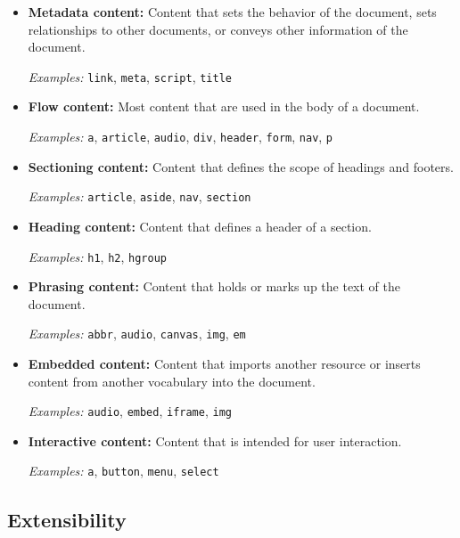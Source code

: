 \begin{itemize}
\item \textbf{Metadata content:} Content that sets the behavior of the
  document, sets relationships to other documents, or conveys other
  information of the document.

  \textit{Examples:} \texttt{link}, \texttt{meta}, \texttt{script},
  \texttt{title}

\item \textbf{Flow content:} Most content that are used in the body of
  a document.

  \textit{Examples:} \texttt{a}, \texttt{article}, \texttt{audio},
  \texttt{div}, \texttt{header}, \texttt{form}, \texttt{nav},
  \texttt{p}

\item \textbf{Sectioning content:} Content that defines the scope of
  headings and footers.

  \textit{Examples:} \texttt{article}, \texttt{aside}, \texttt{nav},
  \texttt{section}

\item \textbf{Heading content:} Content that defines a header of a
  section.

  \textit{Examples:} \texttt{h1}, \texttt{h2}, \texttt{hgroup}

\item \textbf{Phrasing content:} Content that holds or marks up the
  text of the document.

  \textit{Examples:} \texttt{abbr}, \texttt{audio}, \texttt{canvas},
  \texttt{img}, \texttt{em}

\item \textbf{Embedded content:} Content that imports another resource
  or inserts content from another vocabulary into the document.

  \textit{Examples:} \texttt{audio}, \texttt{embed}, \texttt{iframe},
  \texttt{img}

\item \textbf{Interactive content:} Content that is intended for user
  interaction.

  \textit{Examples:} \texttt{a}, \texttt{button}, \texttt{menu},
  \texttt{select}

\end{itemize}

\subsection{Extensibility}

